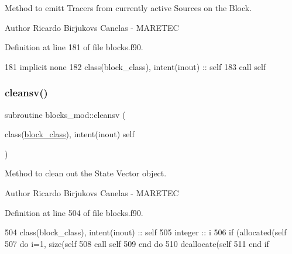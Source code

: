 Method to emitt Tracers from currently active Sources on the Block. 

\begin{DoxyAuthor}{Author}
Ricardo Birjukovs Canelas -\/ M\+A\+R\+E\+T\+EC 
\end{DoxyAuthor}


Definition at line 181 of file blocks.\+f90.


\begin{DoxyCode}
181     \textcolor{keywordtype}{implicit none}
182     \textcolor{keywordtype}{class}(block\_class), \textcolor{keywordtype}{intent(inout)} :: self
183     \textcolor{keyword}{call }self%
\end{DoxyCode}
\mbox{\label{namespaceblocks__mod_ab70bfe5cdce5a717115cfbac04f606a0}} 
\subsubsection{\texorpdfstring{cleansv()}{cleansv()}}
{\footnotesize\ttfamily subroutine blocks\+\_\+mod\+::cleansv (\begin{DoxyParamCaption}\item[{class(\mbox{\hyperlink{structblocks__mod_1_1block__class}{block\+\_\+class}}), intent(inout)}]{self }\end{DoxyParamCaption})\hspace{0.3cm}{\ttfamily [private]}}



Method to clean out the State Vector object. 

\begin{DoxyAuthor}{Author}
Ricardo Birjukovs Canelas -\/ M\+A\+R\+E\+T\+EC 
\end{DoxyAuthor}


Definition at line 504 of file blocks.\+f90.


\begin{DoxyCode}
504     \textcolor{keywordtype}{class}(block\_class), \textcolor{keywordtype}{intent(inout)} :: self
505     \textcolor{keywordtype}{integer} :: i
506     \textcolor{keywordflow}{if} (\textcolor{keyword}{allocated}(self%
507         \textcolor{keywordflow}{do} i=1, \textcolor{keyword}{size}(self%
508             \textcolor{keyword}{call }self%
509 \textcolor{keywordflow}{        end do}
510         \textcolor{keyword}{deallocate}(self%
511 \textcolor{keywordflow}{    end if}
\end{DoxyCode}
\mbox{\label{namespaceblocks__mod_a25ff530b5125e4cee5b1f474b2491883}} 
